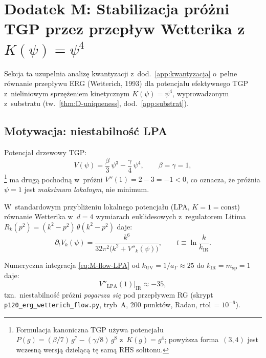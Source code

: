 
\section{Dodatek M: Stabilizacja pr\'o\.zni TGP
         przez przep\l{}yw Wetterika z~$K(\psi)=\psi^4$}
\label{app:M-erg}

Sekcja ta uzupe\l{}nia analiz\k{e} kwantyzacji z~dod.~\ref{app:kwantyzacja}
o~pe\l{}ne r\'ownanie przep\l{}ywu ERG (Wetterich, 1993)
dla potencja\l{}u efektywnego TGP z~nieliniowym sprz\k{e}\.zeniem
kinetycznym $K(\psi)=\psi^4$, wyprowadzonym z~substratu
(tw.~\ref{thm:D-uniqueness}, dod.~\ref{app:substrat}).

\subsection{Motywacja: niestabilno\'s\'c LPA}
\label{ssec:M-motywacja}

Potencja\l{} drzewowy TGP:
\begin{equation}\label{eq:M-Vtree}
    V(\psi) = \frac{\beta}{3}\,\psi^3 - \frac{\gamma}{4}\,\psi^4,
    \qquad \beta = \gamma = 1,
\end{equation}%
\footnote{Formulacja kanoniczna TGP u\.zywa potencja\l{}u $P(g) = (\beta/7)\,g^7 - (\gamma/8)\,g^8$ z~$K(g) = g^4$; powy\.zsza forma~$(3,4)$ jest wczesn\k{a} wersj\k{a} dziel\k{a}c\k{a} t\k{e} sam\k{a} RHS solitonu.}%
ma drug\k{a} pochodn\k{a} w~pr\'o\.zni
$V''(1) = 2 - 3 = -1 < 0$,
co oznacza, \.ze pr\'o\.znia $\psi = 1$ jest
\emph{maksimum lokalnym}, nie minimum.

W~standardowym przybli\.zeniu lokalnego potencja\l{}u
(LPA, $K = 1 = \mathrm{const}$) r\'ownanie Wetterika
w~$d=4$ wymiarach euklidesowych z~regulatorem Litima
$R_k(p^2) = (k^2 - p^2)\,\theta(k^2 - p^2)$ daje:
\begin{equation}\label{eq:M-flow-LPA}
    \partial_t V_k(\psi)
    = \frac{k^6}{32\pi^2\bigl(k^2 + V''_k(\psi)\bigr)},
    \qquad t \equiv \ln\frac{k}{k_{\mathrm{IR}}}.
\end{equation}

\begin{result}%
\label{res:M-LPA-unstable}
Numeryczna integracja \eqref{eq:M-flow-LPA}
od $k_{\mathrm{UV}} = 1/a_\Gamma \approx 25$
do $k_{\mathrm{IR}} = m_{\mathrm{sp}} = 1$ daje:
\begin{equation}
    V''_{\mathrm{LPA}}(1)\big|_{\mathrm{IR}} \approx -35,
\end{equation}
tzn.\ niestabilno\'s\'c pr\'o\.zni \emph{pogarsza si\k{e}} pod przep\l{}ywem
RG (skrypt \texttt{p120\_erg\_wetterich\_flow.py}, tryb~A, 200 punkt\'ow,
Radau, rtol\,$= 10^{-6}$).
\end{result}

